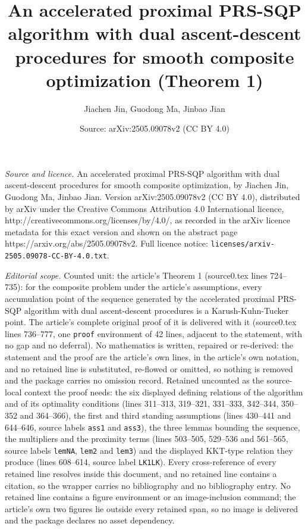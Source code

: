 \documentclass[10pt,a4paper]{amsart}
\title[Theorem 1]{An accelerated proximal PRS-SQP algorithm with dual ascent-descent procedures for smooth composite optimization (Theorem 1)}
\author{Jiachen Jin, Guodong Ma, Jinbao Jian}
\date{Source: arXiv:2505.09078v2 (CC BY 4.0)}
\begin{document}
\maketitle

\noindent\emph{Source and licence.} An accelerated proximal PRS-SQP algorithm with dual ascent-descent procedures for smooth composite optimization, by Jiachen Jin, Guodong Ma, Jinbao Jian. Version arXiv:2505.09078v2
(CC BY 4.0), distributed by arXiv under the Creative Commons Attribution 4.0 International licence,
http://creativecommons.org/licenses/by/4.0/, as recorded in the arXiv licence metadata for this exact
version and shown on the abstract page https://arxiv.org/abs/2505.09078v2. Full licence notice:
\texttt{licenses/arxiv-2505.09078-CC-BY-4.0.txt}.\par\smallskip

\noindent\textit{Editorial scope.} Counted unit: the article's Theorem 1 (source0.tex lines 724--735): for the composite problem under the article's assumptions, every accumulation point of the sequence generated by the accelerated proximal PRS-SQP algorithm with dual ascent-descent procedures is a Karush-Kuhn-Tucker point. The article's complete original proof of it is delivered with it (source0.tex lines 736--777, one \texttt{proof} environment of 42 lines, adjacent to the statement, with no gap and no deferral). No mathematics is written, repaired or re-derived: the statement and the proof are the article's own lines, in the article's own notation, and no retained line is substituted, re-flowed or omitted, so nothing is removed and the package carries no omission record. Retained uncounted as the source-local context the proof needs: the six displayed defining relations of the algorithm and of its optimality conditions (lines 311--313, 319--321, 331--333, 342--344, 350--352 and 364--366), the first and third standing assumptions (lines 430--441 and 644--646, source labels \texttt{ass1} and \texttt{ass3}), the three lemmas bounding the sequence, the multipliers and the proximity terms (lines 503--505, 529--536 and 561--565, source labels \texttt{lemNA}, \texttt{lem2} and \texttt{lem3}) and the displayed KKT-type relation they produce (lines 608--614, source label \texttt{LK1LK}). Every cross-reference of every retained line resolves inside this document, and no retained line contains a citation, so the wrapper carries no bibliography and no bibliography entry. No retained line contains a figure environment or an image-inclusion command; the article's own two figures lie outside every retained span, so no image is delivered and the package declares no asset dependency.
\end{document}
